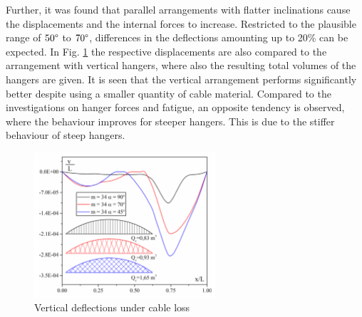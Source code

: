 Further, it was found that parallel arrangements with flatter inclinations cause the displacements and the internal forces to increase. Restricted to the plausible range of $50\degree$ to $70\degree$, differences in the deflections amounting up to 20\% can be expected. In Fig. \ref{fig:Bruno2} the respective displacements are also compared to the arrangement with vertical hangers, where also the resulting total volumes of the hangers are given. It is seen that the vertical arrangement performs significantly better despite using a smaller quantity of cable material. Compared to the investigations on hanger forces and fatigue, an opposite tendency is observed, where the behaviour improves for steeper hangers. This is due to the stiffer behaviour of steep hangers.
\begin{figure}[H]
    \centering
    \includegraphics[width=0.6\textwidth]{Pictures/BrunoArrangements.PNG}
    \caption{Vertical deflections under cable loss \cite{Bruno}}
    \label{fig:Bruno2}
\end{figure}

